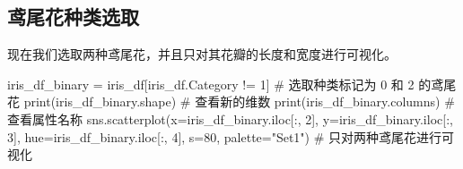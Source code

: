 \documentclass[11pt]{article}
\theoremstyle{definition}
\numberwithin{equation}{section}
\begin{document}
\subsection{鸢尾花种类选取}

现在我们选取两种鸢尾花，并且只对其花瓣的长度和宽度进行可视化。
\begin{python}
iris_df_binary = iris_df[iris_df.Category != 1]  # 选取种类标记为 0 和 2 的鸢尾花
print(iris_df_binary.shape)  # 查看新的维数
print(iris_df_binary.columns)  # 查看属性名称
sns.scatterplot(x=iris_df_binary.iloc[:, 2],
                y=iris_df_binary.iloc[:, 3],
                hue=iris_df_binary.iloc[:, 4],
                s=80, palette="Set1")  # 只对两种鸢尾花进行可视化
\end{python}
\end{document}
